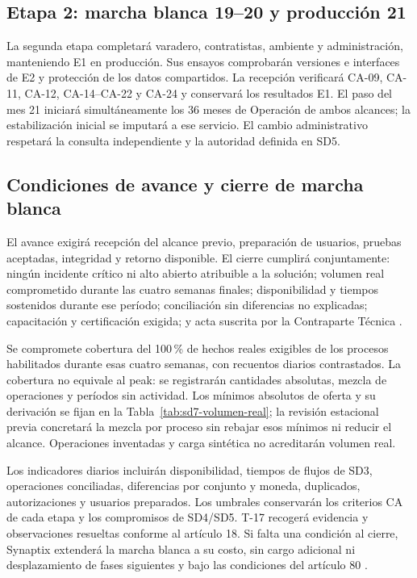 \subsection{Etapa 2: marcha blanca 19--20 y producción 21}
La segunda etapa completará varadero, contratistas, ambiente y administración, manteniendo E1 en producción. Sus ensayos comprobarán versiones e interfaces de E2 y protección de los datos compartidos. La recepción verificará CA-09, CA-11, CA-12, CA-14--CA-22 y CA-24 y conservará los resultados E1. El paso del mes 21 iniciará simultáneamente los 36 meses de Operación de ambos alcances; la estabilización inicial se imputará a ese servicio. El cambio administrativo respetará la consulta independiente y la autoridad definida en SD5.

\subsection{Condiciones de avance y cierre de marcha blanca}
El avance exigirá recepción del alcance previo, preparación de usuarios, pruebas aceptadas, integridad y retorno disponible. El cierre cumplirá conjuntamente: ningún incidente crítico ni alto abierto atribuible a la solución; volumen real comprometido durante las cuatro semanas finales; disponibilidad y tiempos sostenidos durante ese período; conciliación sin diferencias no explicadas; capacitación y certificación exigida; y acta suscrita por la Contraparte Técnica \parencite[art.~17.3, p.~13]{bases-admin}.

Se compromete cobertura del 100\,\% de hechos reales exigibles de los procesos habilitados durante esas cuatro semanas, con recuentos diarios contrastados. La cobertura no equivale al peak: se registrarán cantidades absolutas, mezcla de operaciones y períodos sin actividad. Los mínimos absolutos de oferta y su derivación se fijan en la Tabla~\ref{tab:sd7-volumen-real}; la revisión estacional previa concretará la mezcla por proceso sin rebajar esos mínimos ni reducir el alcance. Operaciones inventadas y carga sintética no acreditarán volumen real.

Los indicadores diarios incluirán disponibilidad, tiempos de flujos de SD3, operaciones conciliadas, diferencias por conjunto y moneda, duplicados, autorizaciones y usuarios preparados. Los umbrales conservarán los criterios CA de cada etapa y los compromisos de SD4/SD5. T-17 recogerá evidencia y observaciones resueltas conforme al artículo 18. Si falta una condición al cierre, Synaptix extenderá la marcha blanca a su costo, sin cargo adicional ni desplazamiento de fases siguientes y bajo las condiciones del artículo 80 \parencite[arts.~17.3 y 18, p.~13]{bases-admin}.

